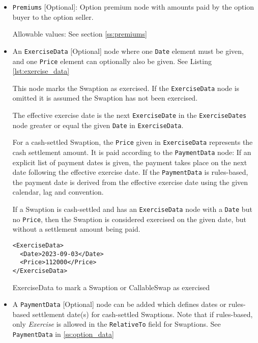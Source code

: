 \begin{itemize}
\item \lstinline!Premiums! [Optional]: Option premium node with amounts paid by the option buyer to the option seller.

Allowable values:  See section \ref{ss:premiums}

\item An \lstinline!ExerciseData! [Optional] node where one  \lstinline!Date! element must be given, and one \lstinline!Price! element can optionally also be given.  See Listing \ref{lst:exercise_data}

This node marks the Swaption as exercised. If the \lstinline!ExerciseData! node is omitted it is assumed the Swaption has not been exercised. 

The effective exercise date is the next \lstinline!ExerciseDate! in the \lstinline!ExerciseDates! node
  greater or equal the given \lstinline!Date!  in \lstinline!ExerciseData!. 
  
  For a cash-settled Swaption, the \lstinline!Price! given in \lstinline!ExerciseData!
  represents the cash settlement amount. It is paid according to the \lstinline!PaymentData! node: If an explicit list of payment dates is given, the payment takes place on the next date following the effective exercise date. If the \lstinline!PaymentData! is rules-based, the payment date is derived from the effective exercise date using the given calendar, lag and convention.
  
If a Swaption is cash-settled and has an \lstinline!ExerciseData! node with a \lstinline!Date!  but no \lstinline!Price!, then the Swaption is considered exercised on the given date, but without a settlement amount being paid.   
  
 \begin{listing}[H]
\begin{verbatim}
<ExerciseData>
  <Date>2023-09-03</Date>
  <Price>112000</Price>
</ExerciseData>
\end{verbatim}
\caption{ExerciseData to mark a Swaption or CallableSwap as exercised}
\label{lst:exercise_data}
\end{listing}
  
\item A \lstinline!PaymentData! [Optional] node can be added which defines dates or rules-based settlement date(s) for cash-settled Swaptions.  Note that if rules-based, only \emph{Exercise} is allowed in the \lstinline!RelativeTo! field for Swaptions. See  \lstinline!PaymentData! in \ref{ss:option_data}


\end{itemize}




